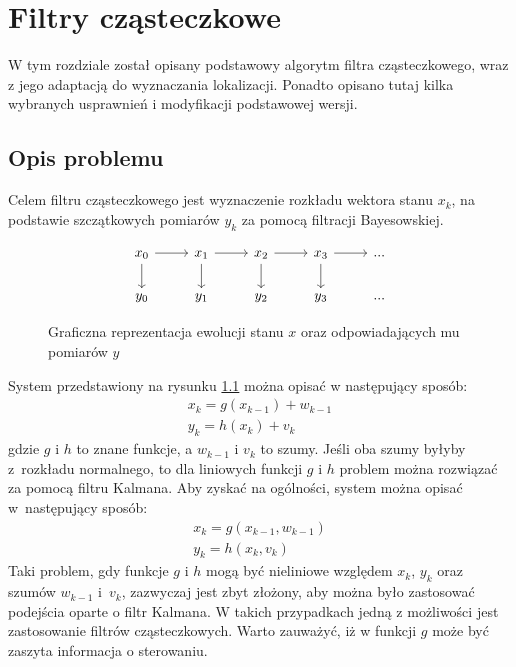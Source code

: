 \chapter{Filtry cząsteczkowe}
W tym rozdziale został opisany podstawowy algorytm filtra cząsteczkowego, wraz z jego adaptacją do wyznaczania lokalizacji. Ponadto opisano tutaj kilka wybranych usprawnień i modyfikacji podstawowej wersji.
\section{Opis problemu}
Celem filtru cząsteczkowego jest wyznaczenie rozkładu wektora stanu $x_k$, na podstawie szczątkowych pomiarów $y_k$ za pomocą filtracji Bayesowskiej.
\begin{figure}[H]
\begin{equation*}
\begin{tikzcd}
	x_0 \arrow{r} \arrow{d} &x_1 \arrow{r} \arrow{d} &x_2 \arrow{r} \arrow{d} &x_3\arrow{r} \arrow{d} &...\\
	y_0 &y_1 &y_2 &y_3 &...
\end{tikzcd} 
\end{equation*}
\caption{Graficzna reprezentacja ewolucji stanu $x$ oraz odpowiadających mu pomiarów $y$}
\label{system_graf_rep}
\end{figure}
System przedstawiony na rysunku \ref{system_graf_rep} można opisać w następujący sposób:
\begin{equation*}
	\begin{aligned}
		x_k=g(x_{k-1})+w_{k-1} \\
		y_k=h(x_k)+v_k
	\end{aligned}
\end{equation*}
gdzie $g$ i $h$ to znane funkcje, a $w_{k-1}$ i $v_k$ to szumy. Jeśli oba szumy byłyby z~rozkładu normalnego, to dla liniowych funkcji $g$ i $h$ problem można rozwiązać za pomocą filtru Kalmana. Aby zyskać na ogólności, system można opisać w~następujący sposób:
\begin{equation} \label{problem_eq}
	\begin{aligned}
		x_k=g(x_{k-1}, w_{k-1}) \\
		y_k=h(x_k, v_k)
	\end{aligned}
\end{equation}
Taki problem, gdy funkcje $g$ i $h$ mogą być nieliniowe względem $x_k$, $y_k$ oraz szumów $w_{k-1}$ i~$v_k$, zazwyczaj jest zbyt złożony, aby można było zastosować podejścia oparte o filtr Kalmana. W takich przypadkach jedną z możliwości jest zastosowanie filtrów cząsteczkowych. Warto zauważyć, iż w funkcji $g$ może być zaszyta informacja o sterowaniu.

